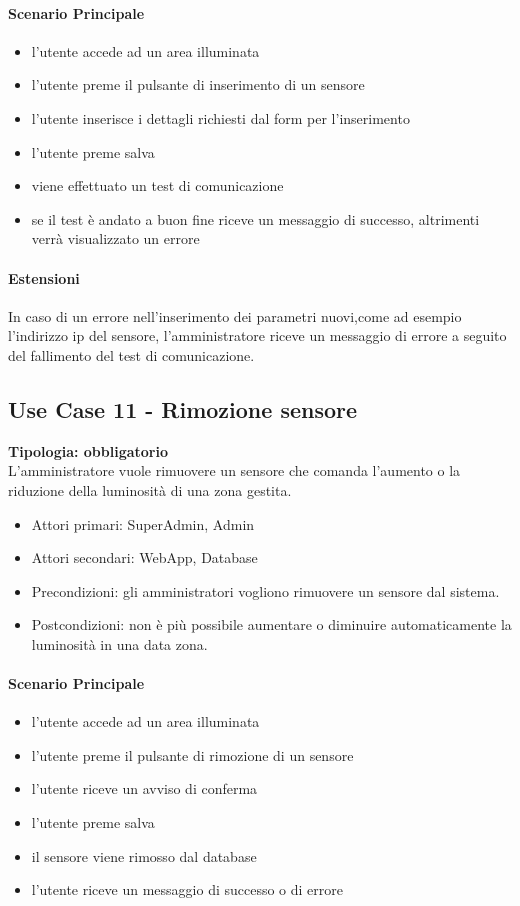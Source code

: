 \documentclass[12pt]{article}
\begin{document}
\paragraph{Scenario Principale}
\begin{itemize}
	\item l'utente accede ad un area illuminata
	\item l'utente preme il pulsante di inserimento di un sensore
	\item l'utente inserisce i dettagli richiesti dal form per l'inserimento
	\item l'utente preme salva
	\item viene effettuato un test di comunicazione
	\item se il test è andato a buon fine riceve un messaggio di successo, altrimenti verrà visualizzato un errore
\end{itemize}
\paragraph{Estensioni} In caso di un errore nell'inserimento dei parametri nuovi,come ad esempio l'indirizzo ip del sensore,  l'amministratore riceve un messaggio di errore a seguito del fallimento del test di comunicazione.

\subsection{Use Case 11 - Rimozione sensore}
\textbf{Tipologia: obbligatorio}\\
L'amministratore vuole rimuovere un sensore che comanda l'aumento o la riduzione della luminosità di una zona gestita.
\begin{itemize}
	\item Attori primari: SuperAdmin, Admin
	\item Attori secondari: WebApp, Database
	\item Precondizioni: gli amministratori vogliono rimuovere un sensore dal sistema.\\
	\item Postcondizioni: non è più possibile aumentare o diminuire automaticamente la luminosità in una data zona.
\end{itemize}
\paragraph{Scenario Principale}
\begin{itemize}
	\item l'utente accede ad un area illuminata
	\item l'utente preme il pulsante di rimozione di un sensore
	\item l'utente riceve un avviso di conferma
	\item l'utente preme salva
	\item il sensore viene rimosso dal database
	\item l'utente riceve un messaggio di successo o di errore
\end{itemize}
\end{document}
